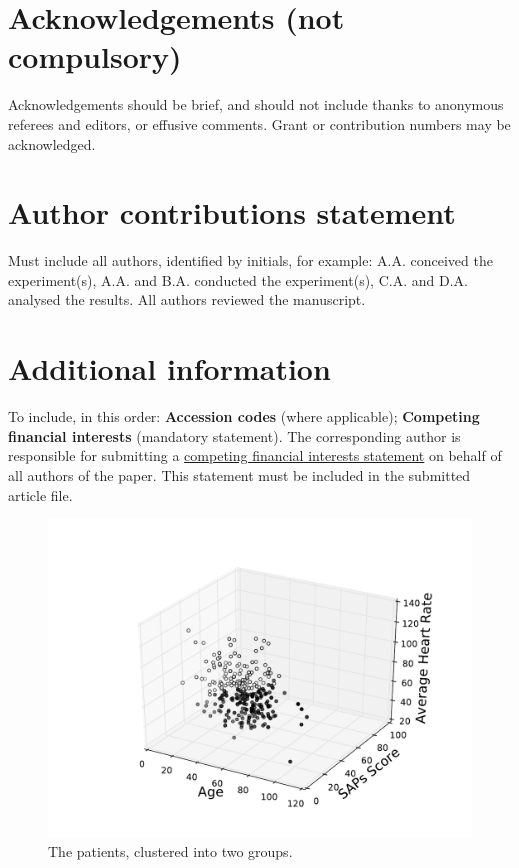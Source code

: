\documentclass[fleqn,10pt]{wlscirep}
\begin{document}
\section*{Acknowledgements (not compulsory)}
Acknowledgements should be brief, and should not include thanks to anonymous referees and editors, or effusive comments. Grant or contribution numbers may be acknowledged.
\section*{Author contributions statement}
Must include all authors, identified by initials, for example:
A.A. conceived the experiment(s),  A.A. and B.A. conducted the experiment(s), C.A. and D.A. analysed the results.  All authors reviewed the manuscript. 
\section*{Additional information}
To include, in this order: \textbf{Accession codes} (where applicable); \textbf{Competing financial interests} (mandatory statement). 
The corresponding author is responsible for submitting a \href{http://www.nature.com/srep/policies/index.html#competing}{competing financial interests statement} on behalf of all authors of the paper. This statement must be included in the submitted article file.
\begin{figure}[ht]
                \centering
        \includegraphics[width=\linewidth]{figures/2clusters}
       \caption{The patients, clustered into two groups.}
       \label{fig:clusteredpatients}
\end{figure}
\end{document}
